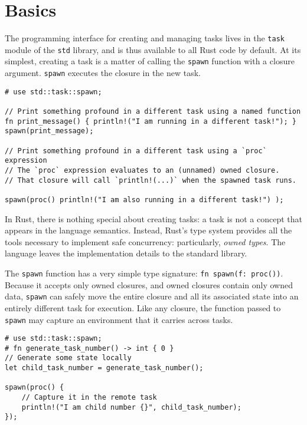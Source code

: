 \documentclass[]{article}
\begin{document}
\section{Basics}\label{basics}

The programming interface for creating and managing tasks lives in the
\texttt{task} module of the \texttt{std} library, and is thus available
to all Rust code by default. At its simplest, creating a task is a
matter of calling the \texttt{spawn} function with a closure argument.
\texttt{spawn} executes the closure in the new task.

\begin{verbatim}
# use std::task::spawn;

// Print something profound in a different task using a named function
fn print_message() { println!("I am running in a different task!"); }
spawn(print_message);

// Print something profound in a different task using a `proc` expression
// The `proc` expression evaluates to an (unnamed) owned closure.
// That closure will call `println!(...)` when the spawned task runs.

spawn(proc() println!("I am also running in a different task!") );
\end{verbatim}

In Rust, there is nothing special about creating tasks: a task is not a
concept that appears in the language semantics. Instead, Rust's type
system provides all the tools necessary to implement safe concurrency:
particularly, \emph{owned types}. The language leaves the implementation
details to the standard library.

The \texttt{spawn} function has a very simple type signature:
\texttt{fn spawn(f: proc())}. Because it accepts only owned closures,
and owned closures contain only owned data, \texttt{spawn} can safely
move the entire closure and all its associated state into an entirely
different task for execution. Like any closure, the function passed to
\texttt{spawn} may capture an environment that it carries across tasks.

\begin{verbatim}
# use std::task::spawn;
# fn generate_task_number() -> int { 0 }
// Generate some state locally
let child_task_number = generate_task_number();

spawn(proc() {
    // Capture it in the remote task
    println!("I am child number {}", child_task_number);
});
\end{verbatim}
\end{document}
